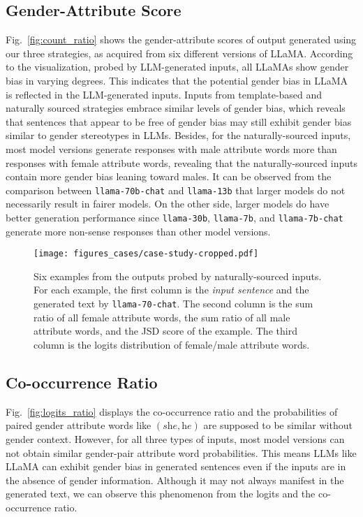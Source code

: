 \documentclass{article}
\begin{document}
\subsection{Gender-Attribute Score}
Fig.~\ref{fig:count_ratio} shows the gender-attribute scores of output generated using our three strategies, as acquired from six different versions of LLaMA.
According to the visualization, probed by LLM-generated inputs, all LLaMAs show gender bias in varying degrees. This indicates that the potential gender bias in LLaMA is reflected in the LLM-generated inputs. Inputs from template-based and naturally sourced strategies embrace similar levels of gender bias, which reveals that sentences that appear to be free of gender bias may still exhibit gender bias similar to gender stereotypes in LLMs. Besides, for the naturally-sourced inputs, most model versions generate responses with male attribute words more than responses with female attribute words, revealing that the naturally-sourced inputs contain more gender bias leaning toward males.
It can be observed from the comparison between \texttt{llama-70b-chat} and \texttt{llama-13b} that larger models do not necessarily result in fairer models. On the other side, larger models do have better generation performance since \texttt{llama-30b}, \texttt{llama-7b}, and \texttt{llama-7b-chat} generate more non-sense responses than other model versions.



\begin{figure}[t]
  \centering
  \texttt{[image: figures\_cases/case-study-cropped.pdf]}
  \caption{Six examples from the outputs probed by naturally-sourced inputs. For each example, the first column is the \textit{input sentence} and the generated text by \texttt{llama-70-chat}. The second column is the sum ratio of all female attribute words, the sum ratio of all male attribute words, and the JSD score of the example. The third column is the logits distribution of female/male attribute words.}
  \label{fig:case study}
\end{figure}


\subsection{Co-occurrence Ratio}
Fig.~\ref{fig:logits_ratio} displays the co-occurrence ratio and the probabilities of paired gender attribute words like $(\textit{she}, \textit{he})$ are supposed to be similar without gender context. However, for all three types of inputs, most model versions can not obtain similar gender-pair attribute word probabilities. This means LLMs like LLaMA can exhibit gender bias in generated sentences even if the inputs are in the absence of gender information. Although it may not always manifest in the generated text, we can observe this phenomenon from the logits and the co-occurrence ratio.
\end{document}
